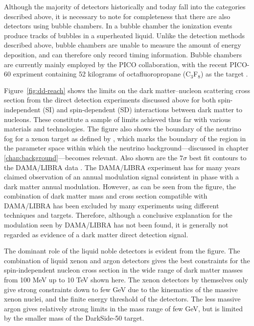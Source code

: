 Although the majority of detectors historically and today fall into the categories described above, it is necessary to note for completeness that there are also detectors using bubble chambers. In a bubble chamber the ionization events produce tracks of bubbles in a superheated liquid. Unlike the detection methods described above, bubble chambers are unable to measure the amount of energy deposition, and can therefore only record timing information. Bubble chambers are currently mainly employed by the PICO collaboration, with the recent PICO-60 expriment containing 52 kilograms of octafluoropropane (C$_3$F$_8$) as the target \parencite{PICO602019}.

Figure~\ref{fig:dd-reach} shows the limits on the dark matter--nucleon scattering cross section from the direct detection experiments discussed above for both spin-independent (SI) and spin-dependent (SD) interactions between dark matter to nucleons. These constitute a sample of limits achieved thus far with various materials and technologies. The figure also shows the boundary of the neutrino fog for a xenon target as defined by \textcite{OHare2021}, which marks the boundary of the region in the parameter space within which the neutrino background---discussed in chapter \ref{chap:background}---becomes relevant. Also shown are the $7\sigma$ best fit contours to the DAMA/LIBRA data \parencite{SavageEtAl2009}. The DAMA/LIBRA experiment has for many years claimed observation of an annual modulation signal consistent in phase with a dark matter annual modulation. However, as can be seen from the figure, the combination of dark matter mass and cross section compatible with DAMA/LIBRA has been excluded by many experiments using different techniques and targets. Therefore, although a conclusive explanation for the modulation seen by DAMA/LIBRA has not been found, it is generally not regarded as evidence of a dark matter direct detection signal.

The dominant role of the liquid noble detectors is evident from the figure. The combination of liquid xenon and argon detectors gives the best constraints for the spin-independent nucleon cross section in the wide range of dark matter masses from 100 MeV up to 10 TeV shown here. The xenon detectors by themselves only give strong constraints down to few GeV due to the kinematics of the massive xenon nuclei, and the finite energy threshold of the detectors. The less massive argon gives relatively strong limits in the mass range of few GeV, but is limited by the smaller mass of the DarkSide-50 target.

